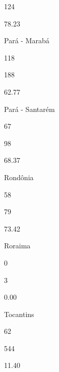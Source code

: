 \documentclass[
  letterpaper,
]{report}
\begin{document}
124

\n      

78.23

\n    

\n    

\n      

Pará - Marabá

\n      

118

\n      

188

\n      

62.77

\n    

\n    

\n      

Pará - Santarém

\n      

67

\n      

98

\n      

68.37

\n    

\n    

\n      

Rondônia

\n      

58

\n      

79

\n      

73.42

\n    

\n    

\n      

Roraima

\n      

0

\n      

3

\n      

0.00

\n    

\n    

\n      

Tocantins

\n      

62

\n      

544

\n      

11.40

\n    
\end{document}
